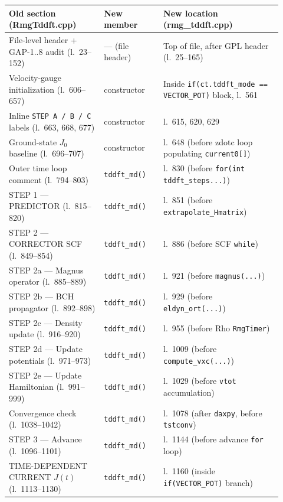\documentclass[11pt,letterpaper]{article}
\begin{document}
\begin{longtable}{p{0.32\linewidth} p{0.20\linewidth} p{0.40\linewidth}}
\toprule
\textbf{Old section (RmgTddft.cpp)} & \textbf{New member} & \textbf{New location (rmg\_tddft.cpp)} \\
\midrule
\endhead
File-level header + GAP-1..8 audit (l.~23--152)
  & --- (file header)
  & Top of file, after GPL header (l.~25--165) \\
\midrule
Velocity-gauge initialization (l.~606--657)
  & constructor
  & Inside \texttt{if(ct.tddft\_mode == VECTOR\_POT)} block, l.~561 \\
Inline \texttt{STEP A / B / C} labels (l.~663, 668, 677)
  & constructor
  & l.~615, 620, 629 \\
Ground-state $J_0$ baseline (l.~696--707)
  & constructor
  & l.~648 (before zdotc loop populating \texttt{current0[]}) \\
\midrule
Outer time loop comment (l.~794--803)
  & \texttt{tddft\_md()}
  & l.~830 (before \texttt{for(int tddft\_steps...)}) \\
STEP 1 --- PREDICTOR (l.~815--820)
  & \texttt{tddft\_md()}
  & l.~851 (before \texttt{extrapolate\_Hmatrix}) \\
STEP 2 --- CORRECTOR SCF (l.~849--854)
  & \texttt{tddft\_md()}
  & l.~886 (before SCF \texttt{while}) \\
STEP 2a --- Magnus operator (l.~885--889)
  & \texttt{tddft\_md()}
  & l.~921 (before \texttt{magnus(...)}) \\
STEP 2b --- BCH propagator (l.~892--898)
  & \texttt{tddft\_md()}
  & l.~929 (before \texttt{eldyn\_ort(...)}) \\
STEP 2c --- Density update (l.~916--920)
  & \texttt{tddft\_md()}
  & l.~955 (before Rho \texttt{RmgTimer}) \\
STEP 2d --- Update potentials (l.~971--973)
  & \texttt{tddft\_md()}
  & l.~1009 (before \texttt{compute\_vxc(...)}) \\
STEP 2e --- Update Hamiltonian (l.~991--999)
  & \texttt{tddft\_md()}
  & l.~1029 (before \texttt{vtot} accumulation) \\
Convergence check (l.~1038--1042)
  & \texttt{tddft\_md()}
  & l.~1078 (after \texttt{daxpy}, before \texttt{tstconv}) \\
STEP 3 --- Advance (l.~1096--1101)
  & \texttt{tddft\_md()}
  & l.~1144 (before advance \texttt{for} loop) \\
TIME-DEPENDENT CURRENT $J(t)$ (l.~1113--1130)
  & \texttt{tddft\_md()}
  & l.~1160 (inside \texttt{if(VECTOR\_POT)} branch) \\
\bottomrule
\end{longtable}
\end{document}
